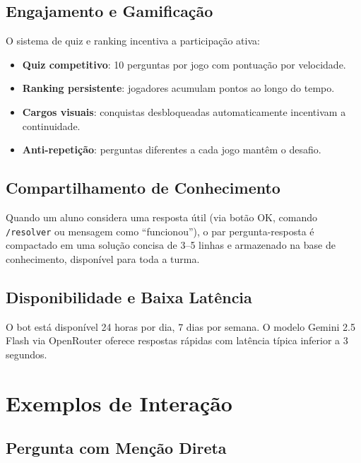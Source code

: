 \documentclass[11pt,a4paper]{article}
\begin{document}
\subsection{Engajamento e Gamificação}

O sistema de quiz e ranking incentiva a participação ativa:
\begin{itemize}[leftmargin=1.5em, itemsep=0.3em]
  \item \textbf{Quiz competitivo}: 10 perguntas por jogo com pontuação por velocidade.
  \item \textbf{Ranking persistente}: jogadores acumulam pontos ao longo do tempo.
  \item \textbf{Cargos visuais}: conquistas desbloqueadas automaticamente incentivam a continuidade.
  \item \textbf{Anti-repetição}: perguntas diferentes a cada jogo mantêm o desafio.
\end{itemize}

\subsection{Compartilhamento de Conhecimento}

Quando um aluno considera uma resposta útil (via botão OK, comando \texttt{/resolver} ou mensagem como ``funcionou''), o par pergunta-resposta é compactado em uma solução concisa de 3--5 linhas e armazenado na base de conhecimento, disponível para toda a turma.

\subsection{Disponibilidade e Baixa Latência}

O bot está disponível 24 horas por dia, 7 dias por semana. O modelo Gemini 2.5 Flash via OpenRouter oferece respostas rápidas com latência típica inferior a 3 segundos.

\section{Exemplos de Interação}

\subsection{Pergunta com Menção Direta}
\end{document}
